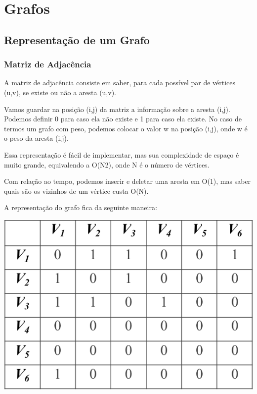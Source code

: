 \documentclass[a4paper,12pt]{article}
\begin{document}
\newpage
\section{Grafos}
\subsection{Representação de um Grafo}
\subsubsection{Matriz de Adjacência}

\indent\indent A matriz de adjacência consiste em saber, para cada possível par de vértices (u,v), se existe ou não a aresta (u,v).

\indent Vamos guardar na posição (i,j) da matriz a informação sobre a aresta (i,j). Podemos definir 0 para caso ela não existe e 1 para caso ela existe. No caso de termos um grafo com peso, podemos colocar o valor w na posição (i,j), onde w é o peso da aresta (i,j).

\indent Essa representação é fácil de implementar, mas sua complexidade de espaço é muito grande, equivalendo a O(N2), onde N é o número de vértices.

\indent Com relação ao tempo, podemos inserir e deletar uma aresta em O(1), mas saber quais são os vizinhos de um vértice custa O(N).

\indent A representação do grafo fica da seguinte maneira:

\begin{center}
  \includegraphics[width=\linewidth/2]{figures/grafos/representacao_matriz_adj.png}
\end{center}
\end{document}
